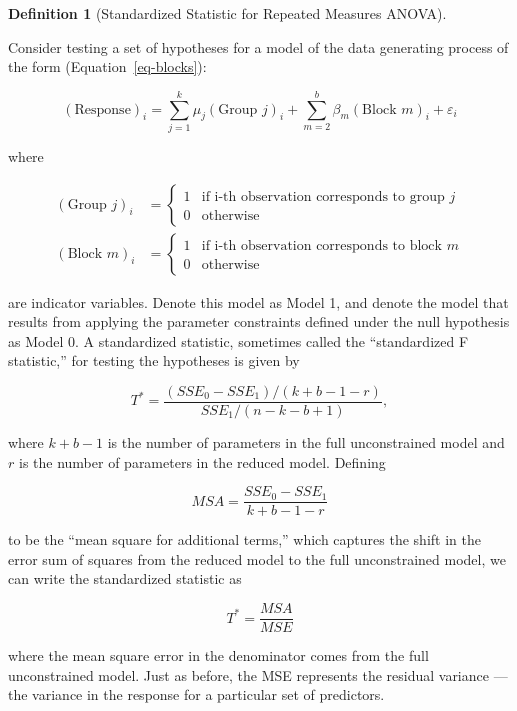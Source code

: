 \documentclass[
  letterpaper,
  DIV=11,
  numbers=noendperiod]{scrreprt}
\theoremstyle{definition}
\newtheorem{definition}{Definition}[chapter]
\theoremstyle{definition}
\theoremstyle{plain}
\theoremstyle{remark}
\begin{document}
\begin{definition}[Standardized Statistic for Repeated Measures
ANOVA]\protect\hypertarget{def-blocks-f}{}\label{def-blocks-f}

Consider testing a set of hypotheses for a model of the data generating
process of the form (Equation~\ref{eq-blocks}):

\[(\text{Response})_i = \sum_{j=1}^{k} \mu_j (\text{Group } j)_i + \sum_{m=2}^{b} \beta_m (\text{Block } m)_i + \varepsilon_i\]

where

\[
\begin{aligned}
  (\text{Group } j)_i 
    &= \begin{cases} 1 & \text{if i-th observation corresponds to group } j \\ 0 & \text{otherwise} \end{cases} \\
  (\text{Block } m)_i
    &= \begin{cases} 1 & \text{if i-th observation corresponds to block } m \\ 0 & \text{otherwise} \end{cases}
\end{aligned}
\]

are indicator variables. Denote this model as Model 1, and denote the
model that results from applying the parameter constraints defined under
the null hypothesis as Model 0. A standardized statistic, sometimes
called the ``standardized F statistic,'' for testing the hypotheses is
given by

\[T^* = \frac{\left(SSE_0 - SSE_1\right) / (k + b - 1 - r)}{SSE_1 / (n - k - b + 1)},\]

where \(k + b - 1\) is the number of parameters in the full
unconstrained model and \(r\) is the number of parameters in the reduced
model. Defining

\[MSA = \frac{SSE_0 - SSE_1}{k + b - 1 - r}\]

to be the ``mean square for additional terms,'' which captures the shift
in the error sum of squares from the reduced model to the full
unconstrained model, we can write the standardized statistic as

\[T^* = \frac{MSA}{MSE}\]

where the mean square error in the denominator comes from the full
unconstrained model. Just as before, the MSE represents the residual
variance --- the variance in the response for a particular set of
predictors.

\end{definition}
\end{document}
